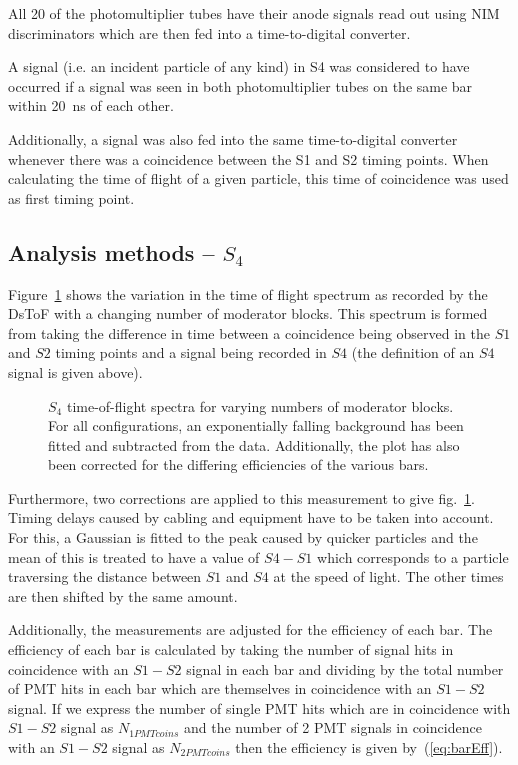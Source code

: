     All 20 of the photomultiplier tubes have their anode signals read out using NIM discriminators which are then fed into a time-to-digital converter. 
    
    A signal (i.e. an incident particle of any kind) in S4 was considered to have occurred if a signal was seen in both photomultiplier tubes on the same bar within 20~ns of each other.
    
    Additionally, a signal was also fed into the same time-to-digital converter whenever there was a coincidence between the S1 and S2 timing points. When calculating the time of flight of a given particle, this time of coincidence was used as first timing point.
    
	\subsection{Analysis methods -- $S_{4}$}

	Figure~\ref{fig:s4tof} shows the variation in the time of flight spectrum as recorded by the DsToF with a changing number of moderator blocks. This spectrum is formed from taking the difference in time between a coincidence being observed in the $S1$ and $S2$ timing points and a signal being recorded in $S4$ (the definition of an $S4$ signal is given above).
	
	\begin{figure}[h]
		\begin{adjustbox}{max totalsize={.8\textwidth}{.7\textheight},center}
			
		\end{adjustbox}
		\caption{$S_{4}$ time-of-flight spectra for varying numbers of moderator blocks. For all configurations, an exponentially falling background has been fitted and subtracted from the data. Additionally, the plot has also been corrected for the differing efficiencies of the various bars.}
		\label{fig:s4tof}	
	\end{figure}

	Furthermore, two corrections are applied to this measurement to give fig.~\ref{fig:s4tof}. Timing delays caused by cabling and equipment have to be taken into account. For this, a Gaussian is fitted to the peak caused by quicker particles and the mean of this is treated to have a value of $S4 - S1$ which corresponds to a particle traversing the distance between $S1$ and $S4$ at the speed of light. The other times are then shifted by the same amount.
	
	Additionally, the measurements are adjusted for the efficiency of each bar. The efficiency of each bar is calculated by taking the number of signal hits in coincidence with an $S1-S2$ signal in each bar and dividing by the total number of PMT hits in each bar which are themselves in coincidence with an $S1-S2$ signal. If we express the number of single PMT hits which are in coincidence with $S1-S2$ signal as $N_{1PMTcoins}$ and the number of 2 PMT signals in coincidence with an $S1-S2$ signal as $N_{2PMTcoins}$ then the efficiency is given by~(\ref{eq:barEff}).
	
